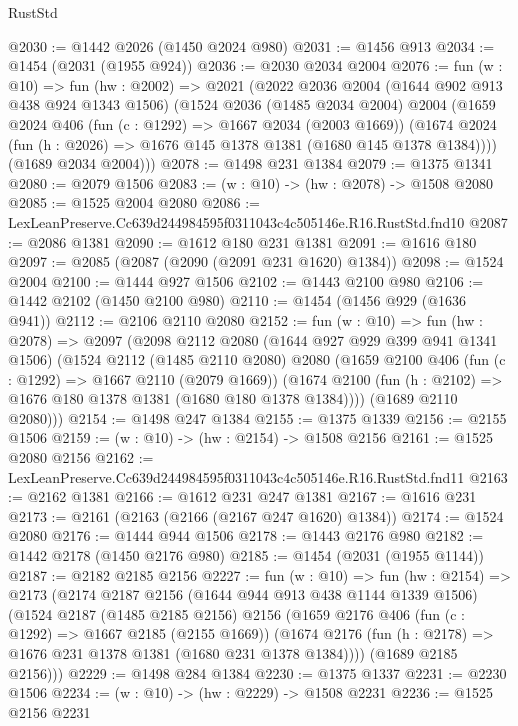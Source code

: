 \begin{lexlean}{RustStd}
\begin{coremodule}
@2030 := @1442 @2026 (@1450 @2024 @980)
@2031 := @1456 @913
@2034 := @1454 (@2031 (@1955 @924))
@2036 := @2030 @2034 @2004
@2076 := fun (w : @10) =>
  fun (hw : @2002) =>
  @2021
    (@2022
      @2036
      @2004
      (@1644 @902 @913 @438 @924 @1343 @1506)
      (@1524
        @2036
        (@1485 @2034 @2004)
        @2004
        (@1659
          @2024
          @406
          (fun (c : @1292) => @1667 @2034 (@2003 @1669))
          (@1674 @2024 (fun (h : @2026) => @1676 @145 @1378 @1381 (@1680 @145 @1378 @1384))))
        (@1689 @2034 @2004)))
@2078 := @1498 @231 @1384
@2079 := @1375 @1341
@2080 := @2079 @1506
@2083 := (w : @10) -> (hw : @2078) -> @1508 @2080
@2085 := @1525 @2004 @2080
@2086 := LexLeanPreserve.Cc639d244984595f0311043c4c505146e.R16.RustStd.fnd10
@2087 := @2086 @1381
@2090 := @1612 @180 @231 @1381
@2091 := @1616 @180
@2097 := @2085 (@2087 (@2090 (@2091 @231 @1620) @1384))
@2098 := @1524 @2004
@2100 := @1444 @927 @1506
@2102 := @1443 @2100 @980
@2106 := @1442 @2102 (@1450 @2100 @980)
@2110 := @1454 (@1456 @929 (@1636 @941))
@2112 := @2106 @2110 @2080
@2152 := fun (w : @10) =>
  fun (hw : @2078) =>
  @2097
    (@2098
      @2112
      @2080
      (@1644 @927 @929 @399 @941 @1341 @1506)
      (@1524
        @2112
        (@1485 @2110 @2080)
        @2080
        (@1659
          @2100
          @406
          (fun (c : @1292) => @1667 @2110 (@2079 @1669))
          (@1674 @2100 (fun (h : @2102) => @1676 @180 @1378 @1381 (@1680 @180 @1378 @1384))))
        (@1689 @2110 @2080)))
@2154 := @1498 @247 @1384
@2155 := @1375 @1339
@2156 := @2155 @1506
@2159 := (w : @10) -> (hw : @2154) -> @1508 @2156
@2161 := @1525 @2080 @2156
@2162 := LexLeanPreserve.Cc639d244984595f0311043c4c505146e.R16.RustStd.fnd11
@2163 := @2162 @1381
@2166 := @1612 @231 @247 @1381
@2167 := @1616 @231
@2173 := @2161 (@2163 (@2166 (@2167 @247 @1620) @1384))
@2174 := @1524 @2080
@2176 := @1444 @944 @1506
@2178 := @1443 @2176 @980
@2182 := @1442 @2178 (@1450 @2176 @980)
@2185 := @1454 (@2031 (@1955 @1144))
@2187 := @2182 @2185 @2156
@2227 := fun (w : @10) =>
  fun (hw : @2154) =>
  @2173
    (@2174
      @2187
      @2156
      (@1644 @944 @913 @438 @1144 @1339 @1506)
      (@1524
        @2187
        (@1485 @2185 @2156)
        @2156
        (@1659
          @2176
          @406
          (fun (c : @1292) => @1667 @2185 (@2155 @1669))
          (@1674 @2176 (fun (h : @2178) => @1676 @231 @1378 @1381 (@1680 @231 @1378 @1384))))
        (@1689 @2185 @2156)))
@2229 := @1498 @284 @1384
@2230 := @1375 @1337
@2231 := @2230 @1506
@2234 := (w : @10) -> (hw : @2229) -> @1508 @2231
@2236 := @1525 @2156 @2231

\end{coremodule}
\end{lexlean}
